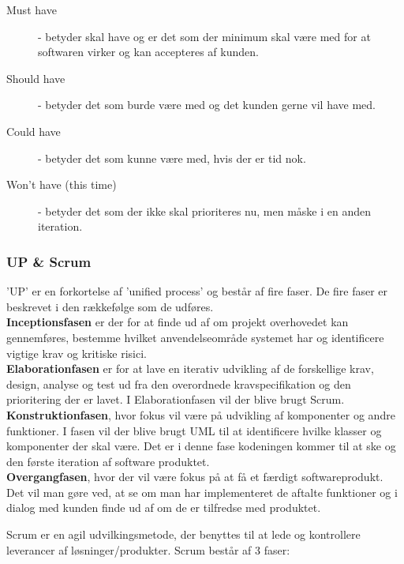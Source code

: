 \begin{description}
    \item [Must have] - betyder skal have og er det som der minimum skal være med for at softwaren virker og kan accepteres af kunden. 
    \item [Should have] - betyder det som burde være med og det kunden gerne vil have med.
    \item [Could have] - betyder det som kunne være med, hvis der er tid nok. 
    \item [Won't have (this time)] - betyder det som der ikke skal prioriteres nu, men måske i en anden iteration.
\end{description}


\subsubsection{UP \& Scrum}

'UP' er en forkortelse af 'unified process' og består af fire faser. De fire faser er beskrevet i den rækkefølge som de udføres. \\

\noindent
\textbf{Inceptionsfasen} er der for at finde ud af om projekt overhovedet kan gennemføres, bestemme hvilket anvendelseområde systemet har og identificere vigtige krav og kritiske risici. \\

\noindent
\textbf{Elaborationfasen} er for at lave en iterativ udvikling af de forskellige krav, design, analyse og test ud fra den overordnede kravspecifikation og den prioritering der er lavet. I Elaborationfasen vil der blive brugt Scrum. \\

\noindent
\textbf{Konstruktionfasen}, hvor fokus vil være på udvikling af komponenter og andre funktioner.
I fasen vil der blive brugt UML til at identificere hvilke klasser og komponenter der skal være. Det er i denne fase kodeningen kommer til at ske og den første iteration af software produktet.  \\

\noindent
\textbf{Overgangfasen}, hvor der vil være fokus på at få et færdigt softwareprodukt.
Det vil man gøre ved, at se om man har implementeret de aftalte funktioner og i dialog med kunden finde ud af om de er tilfredse med produktet.

Scrum er en agil udvilkingsmetode, der benyttes til at lede og kontrollere leverancer af løsninger/produkter. Scrum består af 3 faser: 

